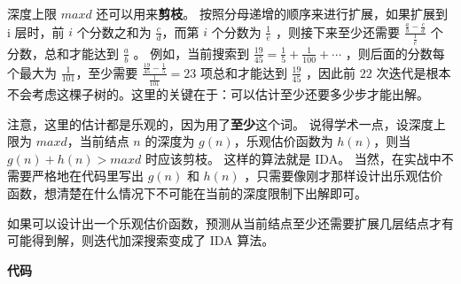 深度上限 $maxd$ 还可以用来\textbf{剪枝}。 按照分母递增的顺序来进行扩展，如果扩展到 i 层时，前 $i$ 个分数之和为 $\frac{c}{d}$，而第 $i$ 个分数为 $\frac{1}{e}$ ，则接下来至少还需要 $\frac{\frac{a}{b}-\frac{c}{d}}{\frac{1}{e}}$ 个分数，总和才能达到 $\frac{a}{b}$ 。 例如，当前搜索到 $\frac{19}{45}=\frac{1}{5}+\frac{1}{100}+\cdots$ ，则后面的分数每个最大为 $\frac{1}{101}$，至少需要 $\frac{\frac{19}{45}-\frac{1}{5}}{\frac{1}{101}}=23$ 项总和才能达到 $\frac{19}{45}$ ，因此前 $22$ 次迭代是根本不会考虑这棵子树的。这里的关键在于：可以估计至少还要多少步才能出解。 

注意，这里的估计都是乐观的，因为用了\textbf{至少}这个词。 说得学术一点，设深度上限为 $maxd$，当前结点 $n$ 的深度为 $g(n)$，乐观估价函数为 $h(n)$，则当 $g(n)+h(n)>maxd$ 时应该剪枝。 这样的算法就是 IDA。 当然，在实战中不需要严格地在代码里写出 $g(n)$ 和 $h(n)$ ，只需要像刚才那样设计出乐观估价函数，想清楚在什么情况下不可能在当前的深度限制下出解即可。

\begin{QUOTE}{}{}
如果可以设计出一个乐观估价函数，预测从当前结点至少还需要扩展几层结点才有可能得到解，则迭代加深搜索变成了 IDA 算法。
\end{QUOTE}

\textbf{代码}

